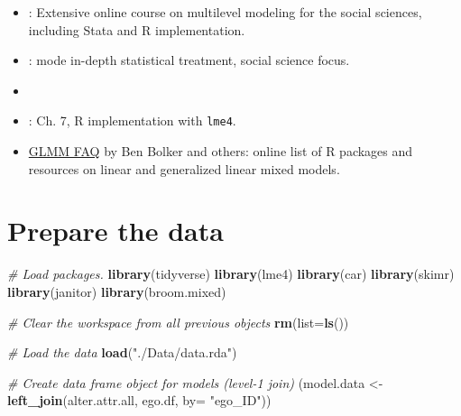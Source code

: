 \documentclass[
]{book}
\newenvironment{Shaded}{\begin{snugshade}}{\end{snugshade}}
\newcommand{\AttributeTok}[1]{\textcolor[rgb]{0.13,0.29,0.53}{#1}}
\newcommand{\CommentTok}[1]{\textcolor[rgb]{0.56,0.35,0.01}{\textit{#1}}}
\newcommand{\FunctionTok}[1]{\textcolor[rgb]{0.13,0.29,0.53}{\textbf{#1}}}
\newcommand{\NormalTok}[1]{#1}
\newcommand{\OtherTok}[1]{\textcolor[rgb]{0.56,0.35,0.01}{#1}}
\newcommand{\StringTok}[1]{\textcolor[rgb]{0.31,0.60,0.02}{#1}}
\providecommand{\tightlist}{%
  \setlength{\itemsep}{0pt}\setlength{\parskip}{0pt}}
\begin{document}
\begin{itemize}
\tightlist
\item
  \href{https://www.cmm.bris.ac.uk/lemma}{\citet{rasbash_lemma:_2008}}: Extensive online course on multilevel modeling for the social sciences, including Stata and R implementation.
\item
  \citet{snijders_multilevel_2012}: mode in-depth statistical treatment, social science focus.
\item
  \citet{goldstein_multilevel_2010}
\item
  \citet{fox_r_2018}: Ch. 7, R implementation with \texttt{lme4}.
\item
  \href{http://bbolker.github.io/mixedmodels-misc/glmmFAQ.html}{GLMM FAQ} by Ben Bolker and others: online list of R packages and resources on linear and generalized linear mixed models.
\end{itemize}

\hypertarget{prepare-the-data}{%
\section{Prepare the data}\label{prepare-the-data}}

\begin{Shaded}
\begin{Highlighting}[]
\CommentTok{\# Load packages.}
\FunctionTok{library}\NormalTok{(tidyverse)}
\FunctionTok{library}\NormalTok{(lme4)}
\FunctionTok{library}\NormalTok{(car)}
\FunctionTok{library}\NormalTok{(skimr)}
\FunctionTok{library}\NormalTok{(janitor)}
\FunctionTok{library}\NormalTok{(broom.mixed)}

\CommentTok{\# Clear the workspace from all previous objects}
\FunctionTok{rm}\NormalTok{(}\AttributeTok{list=}\FunctionTok{ls}\NormalTok{())}

\CommentTok{\# Load the data}
\FunctionTok{load}\NormalTok{(}\StringTok{"./Data/data.rda"}\NormalTok{)}

\CommentTok{\# Create data frame object for models (level{-}1 join)}
\NormalTok{(model.data }\OtherTok{\textless{}{-}} \FunctionTok{left\_join}\NormalTok{(alter.attr.all, ego.df, }\AttributeTok{by=} \StringTok{"ego\_ID"}\NormalTok{))}
\end{Highlighting}
\end{Shaded}
\end{document}
